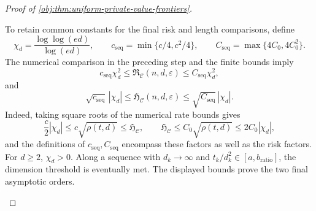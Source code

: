 \begin{proof}[Proof of \cref{obj:thm:uniform-private-value-frontiers}]
\begin{enumerate}
To retain common constants for the final risk and length comparisons, define
\[
\chi_d=\frac{\log\log(ed)}{\log(ed)},\qquad
c_{\mathrm{seq}}=\min\{c/4,c^2/4\},\qquad
C_{\mathrm{seq}}=\max\{4C_0,4C_0^2\}.
\]
The numerical comparison in the preceding step and the finite bounds imply
\[
c_{\mathrm{seq}}\chi_d^2
\le\mathfrak R_{\mathcal C}(n,d,\varepsilon)
\le C_{\mathrm{seq}}\chi_d^2,
\]
and
\[
\sqrt{c_{\mathrm{seq}}}\,|\chi_d|
\le\mathfrak H_{\mathcal C}(n,d,\varepsilon)
\le\sqrt{C_{\mathrm{seq}}}\,|\chi_d|.
\]
Indeed, taking square roots of the numerical rate bounds gives
\[
\frac c2|\chi_d|
\le c\sqrt{\rho(t,d)}
\le\mathfrak H_{\mathcal C},
\qquad
\mathfrak H_{\mathcal C}
\le C_0\sqrt{\rho(t,d)}
\le2C_0|\chi_d|,
\]
and the definitions of \(c_{\mathrm{seq}},C_{\mathrm{seq}}\) encompass these factors as well as the risk factors.
For \(d\ge2\), \(\chi_d>0\).
Along a sequence with \(d_k\to\infty\) and
\(t_k/d_k^2\in[a,b_{\mathrm{ratio}}]\), the dimension threshold is eventually met.
The displayed bounds prove the two final asymptotic orders.
\end{enumerate}
\end{proof}

